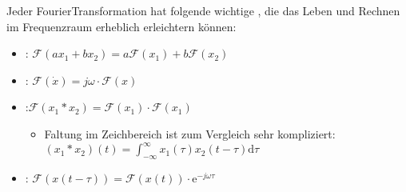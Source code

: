 \documentclass[letterpaper,10pt,english]{jupyterBook}
\begin{document}
\sphinxAtStartPar
Jeder Fourier\sphinxhyphen{}Transformation hat folgende wichtige , die das Leben und Rechnen im Frequenzraum erheblich erleichtern können:
\begin{itemize}
\item {} 
\sphinxAtStartPar
{}: \(\mathcal F(ax_1 + bx_2) = a\mathcal F(x_1)+ b \mathcal F(x_2)\)

\item {} 
\sphinxAtStartPar
{}: \(\mathcal F(\dot x) = j\omega \cdot \mathcal F(x)\)

\item {} 
\sphinxAtStartPar
{}:\( \mathcal F(x_1*x_2) = \mathcal F(x_1) \cdot \mathcal F(x_1)\)
\begin{itemize}
\item {} 
\sphinxAtStartPar
Faltung im Zeichbereich ist zum Vergleich sehr kompliziert: \((x_1 \ast x_2)(t) = \int_{-\infty}^{\infty} x_1(\tau)x_2(t-\tau) \mathrm{d}\tau\)

\end{itemize}

\item {} 
\sphinxAtStartPar
{}: \(\mathcal F(x(t-\tau)) = \mathcal F(x(t)) \cdot \mathrm e^{-j\omega \tau}\)

\end{itemize}
\end{document}
